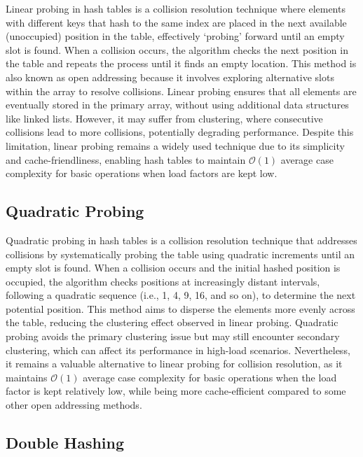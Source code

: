 Linear probing in hash tables is a collision resolution technique where elements with different keys that hash to the same index are placed in the next available (unoccupied) position in the table, effectively 
`probing' forward until an empty slot is found. When a collision occurs, the algorithm checks the next position in the table and repeats the process until it finds an empty location. This method is also known as 
open addressing because it involves exploring alternative slots within the array to resolve collisions. Linear probing ensures that all elements are eventually stored in the primary array, without using additional 
data structures like linked lists. However, it may suffer from clustering, where consecutive collisions lead to more collisions, potentially degrading performance. Despite this limitation, linear probing remains 
a widely used technique due to its simplicity and cache-friendliness, enabling hash tables to maintain $\mathcal{O}(1)$ average case complexity for basic operations when load factors are kept low.

\subsection*{Quadratic Probing}

Quadratic probing in hash tables is a collision resolution technique that addresses collisions by systematically probing the table using quadratic increments until an empty slot is found. When a collision occurs 
and the initial hashed position is occupied, the algorithm checks positions at increasingly distant intervals, following a quadratic sequence (i.e., 1, 4, 9, 16, and so on), to determine the next potential position. 
This method aims to disperse the elements more evenly across the table, reducing the clustering effect observed in linear probing. Quadratic probing avoids the primary clustering issue but may still encounter 
secondary clustering, which can affect its performance in high-load scenarios. Nevertheless, it remains a valuable alternative to linear probing for collision resolution, as it maintains $\mathcal{O}(1)$ average 
case complexity for basic operations when the load factor is kept relatively low, while being more cache-efficient compared to some other open addressing methods.

\subsection*{Double Hashing}


